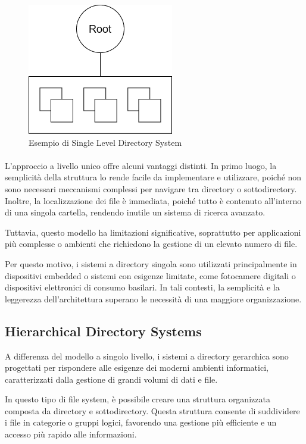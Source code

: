 \documentclass[12pt,a4paper,openright,twoside]{book}
\begin{document}
            \begin{figure}
                \centering
                \includegraphics[width=.3\linewidth]{figures/SingleDirSystem.png}
                \caption{Esempio di Single Level Directory System}
                \label{fig:random-image}
            \end{figure}

            \paragraph*{}

            L'approccio a livello unico offre alcuni vantaggi distinti. In primo luogo, la semplicità della struttura lo rende facile da implementare e utilizzare, poiché non sono necessari meccanismi complessi per navigare tra directory o sottodirectory. Inoltre, la localizzazione dei file è immediata, poiché tutto è contenuto all'interno di una singola cartella, rendendo inutile un sistema di ricerca avanzato.

            Tuttavia, questo modello ha limitazioni significative, soprattutto per applicazioni più complesse o ambienti che richiedono la gestione di un elevato numero di file.

            Per questo motivo, i sistemi a directory singola sono utilizzati principalmente in dispositivi embedded o sistemi con esigenze limitate, come fotocamere digitali o dispositivi elettronici di consumo basilari. In tali contesti, la semplicità e la leggerezza dell'architettura superano le necessità di una maggiore organizzazione.

        \subsection{Hierarchical Directory Systems}

            A differenza del modello a singolo livello, i sistemi a directory gerarchica sono progettati per rispondere alle esigenze dei moderni ambienti informatici, caratterizzati dalla gestione di grandi volumi di dati e file.

            
            In questo tipo di file system, è possibile creare una struttura organizzata composta da directory e sottodirectory. Questa struttura consente di suddividere i file in categorie o gruppi logici, favorendo una gestione più efficiente e un accesso più rapido alle informazioni.
            
\end{document}
